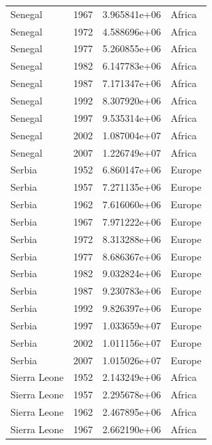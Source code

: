 \documentclass[
  letterpaper,
  DIV=11,
  numbers=noendperiod]{scrreprt}
\begin{document}
\begin{tcolorbox}
\begin{tabular}{lrrl}
Senegal                  &  1967 &  3.965841e+06 &    Africa \\
Senegal                  &  1972 &  4.588696e+06 &    Africa \\
Senegal                  &  1977 &  5.260855e+06 &    Africa \\
Senegal                  &  1982 &  6.147783e+06 &    Africa \\
Senegal                  &  1987 &  7.171347e+06 &    Africa \\
Senegal                  &  1992 &  8.307920e+06 &    Africa \\
Senegal                  &  1997 &  9.535314e+06 &    Africa \\
Senegal                  &  2002 &  1.087004e+07 &    Africa \\
Senegal                  &  2007 &  1.226749e+07 &    Africa \\
Serbia                   &  1952 &  6.860147e+06 &    Europe \\
Serbia                   &  1957 &  7.271135e+06 &    Europe \\
Serbia                   &  1962 &  7.616060e+06 &    Europe \\
Serbia                   &  1967 &  7.971222e+06 &    Europe \\
Serbia                   &  1972 &  8.313288e+06 &    Europe \\
Serbia                   &  1977 &  8.686367e+06 &    Europe \\
Serbia                   &  1982 &  9.032824e+06 &    Europe \\
Serbia                   &  1987 &  9.230783e+06 &    Europe \\
Serbia                   &  1992 &  9.826397e+06 &    Europe \\
Serbia                   &  1997 &  1.033659e+07 &    Europe \\
Serbia                   &  2002 &  1.011156e+07 &    Europe \\
Serbia                   &  2007 &  1.015026e+07 &    Europe \\
Sierra Leone             &  1952 &  2.143249e+06 &    Africa \\
Sierra Leone             &  1957 &  2.295678e+06 &    Africa \\
Sierra Leone             &  1962 &  2.467895e+06 &    Africa \\
Sierra Leone             &  1967 &  2.662190e+06 &    Africa \\

\end{tabular}
\end{tcolorbox}
\end{document}
